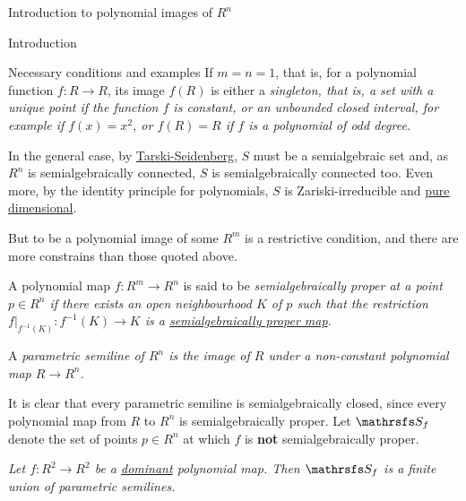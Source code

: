 \documentclass[11pt, a4paper, english, twoside, notitlepage, openright]{report}
\begin{document}
\begin{chapter}{Introduction to polynomial images of $R^n$}
\begin{section}{Introduction}
\begin{subsection}{Necessary conditions and examples}
If $m=n=1$, that is, for a polynomial function $f:R\to R$, its image $f(R)$ is either a \em singleton, \em that is, a set with a unique point if the function $f$ is constant, or an unbounded closed interval, for example if $f(x)=x^2$, or $f(R)=R$ if $f$ is a polynomial of odd degree.
	
In the general case, by \hyperref[tarskiSeidenberg]{Tarski-Seidenberg}, $S$ must be a semialgebraic set and, as $R^n$ is semialgebraically connected, $S$ is semialgebraically connected too. Even more, by the identity principle for polynomials, $S$ is Zariski-irreducible and \hyperref[pureDim]{pure dimensional}.
	
	
But to be a polynomial image of some $R^m$ is a restrictive condition, and there are more constrains than those quoted above. 
	
\begin{definition} A polynomial map $f:R^m\to R^n$ is said to be \em semialgebraically proper at a point $p\in R^n$ \em if there exists an open neighbourhood $K$ of $p$ such that the restriction $f|_{f^{-1}(K)}:f^{-1}(K)\to K$ is a \hyperref[properMap]{semialgebraically proper map}.
\end{definition}
	
\begin{definition} A \em parametric semiline \em of $R^n$ is the image of $R$ under a non-constant polynomial map $R\to R^n$.
\end{definition}
	
It is clear that every parametric semiline is semialgebraically closed, since every polynomial map from $R$ to $R^n$ is semialgebraically proper. Let $\S_f$ denote the set of points $p\in R^n$ at which $f$ is \textbf{not} semialgebraically proper.
	
\begin{theorem}[\em Jelonek\em]\label{jelonek}\em Let $f:R^2\to R^2$ be a \hyperref[dominant]{dominant} polynomial map. Then $\S_f$ is a finite union of parametric semilines.\em
\end{theorem}
	

\end{subsection}
\end{section}
\end{chapter}
\end{document}
